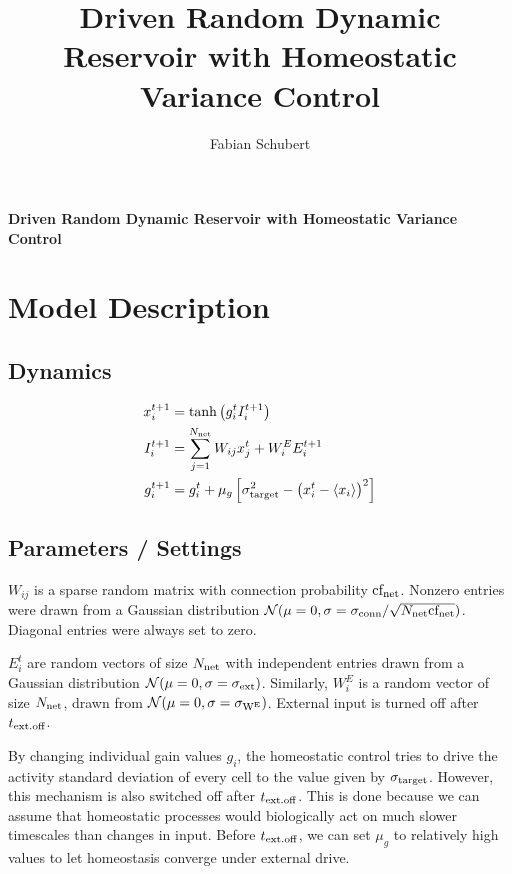 \documentclass[10pt,a4paper]{article}
\author{Fabian Schubert}
\title{Driven Random Dynamic Reservoir with Homeostatic Variance Control}
\begin{document}
\begin{center}
\begin{LARGE}
\textbf{Driven Random Dynamic Reservoir with Homeostatic Variance Control}\\
\end{LARGE}
\end{center}

\section{Model Description}

\subsection{Dynamics}
\begin{align}
x_i^{t+1} &= \mathrm{tanh}\left( g_i^t I_i^{t+1} \right) \label{eq:reserv_dynamics}\\
I_i^{t+1} &= \sum_{j=1}^{N_{\rm net}} W_{ij} x_j^t + W^E_i E_i^{t+1} \label{eq:input_dynamics} \\
g_i^{t+1} &= g_i^{t} + \mu_{g} \left[ \sigma_{\rm target}^2 - \left( x_i^t - \langle x_i \rangle \right)^2 \right] \label{eq:gain_dynamcis}
\end{align}

\subsection{Parameters / Settings}

$W_{ij}$ is a sparse random matrix with connection probability ${\rm cf_{net}}$. Nonzero entries were drawn from a Gaussian distribution $\mathcal{N}(\mu = 0,\sigma = \sigma_{\rm conn} / \sqrt{N_{\rm net} {\rm cf_{net}}})$. Diagonal entries were always set to zero.

$E^t_{i}$ are random vectors of size $N_{\rm net}$ with independent entries drawn from a Gaussian distribution $\mathcal{N}(\mu = 0,\sigma = \sigma_{\rm ext})$. Similarly, $W^E_i$ is a random vector of size $N_{\rm net}$, drawn from $\mathcal{N}(\mu = 0,\sigma = \sigma_{\rm W^E})$. External input is turned off after $t_{\rm ext.off}$.

By changing individual gain values $g_i$, the homeostatic control tries to drive the activity standard deviation of every cell to the value given by $\sigma_{\rm target}$. However, this mechanism is also switched off after $t_{\rm ext.off}$. This is done because we can assume that homeostatic processes would biologically act on much slower timescales than changes in input. Before $t_{\rm ext.off}$, we can set $\mu_{g}$ to relatively high values to let homeostasis converge under external drive.
\end{document}
